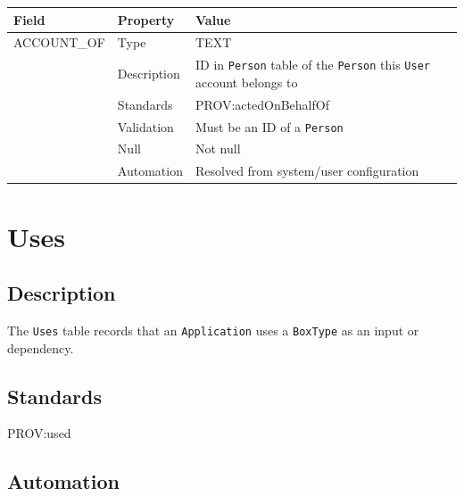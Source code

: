 \documentclass[
]{article}
\newcounter{none}
\begin{document}
{\def\LTcaptype{none} 
\begin{longtable}[]{@{}
  >{\raggedright\arraybackslash}p{}
  >{\raggedright\arraybackslash}p{}
  >{\raggedright\arraybackslash}p{}@{}}
\toprule\noalign{}
\begin{minipage}[b]{\linewidth}\raggedright
Field
\end{minipage} & \begin{minipage}[b]{\linewidth}\raggedright
Property
\end{minipage} & \begin{minipage}[b]{\linewidth}\raggedright
Value
\end{minipage} \\
\midrule\noalign{}
\endhead
\bottomrule\noalign{}
\endlastfoot
ACCOUNT\_OF & Type & TEXT \\
& Description & ID in \texttt{Person} table of the \texttt{Person} this
\texttt{User} account belongs to \\
& Standards & PROV:actedOnBehalfOf \\
& Validation & Must be an ID of a \texttt{Person} \\
& Null & Not null \\
& Automation & Resolved from system/user configuration \\
\end{longtable}
}

\section{Uses}\label{uses}

\subsection{Description}\label{description-36}

The \texttt{Uses} table records that an \texttt{Application} uses a
\texttt{BoxType} as an input or dependency.

\subsection{Standards}\label{standards-38}

PROV:used

\subsection{Automation}\label{automation-38}
\end{document}

